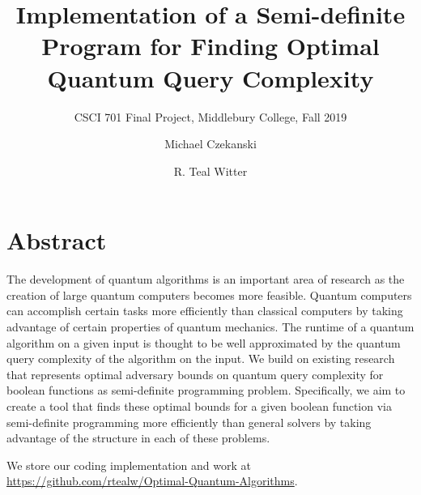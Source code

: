 \documentclass[review]{acmart}
\begin{document}
\title{Implementation of a Semi-definite Program for Finding
Optimal Quantum Query Complexity}

\subtitle{CSCI 701 Final Project, Middlebury College, Fall 2019}

\author{Michael Czekanski}

\author{R. Teal Witter}

\maketitle

\section*{Abstract}

The development of quantum algorithms is an important area
of research as the creation of large quantum computers
becomes more feasible. Quantum computers can accomplish
certain tasks more efficiently than classical computers by
taking advantage of certain properties of quantum mechanics.
The runtime of a quantum algorithm on a given input is
thought to be well approximated by the quantum query
complexity of the algorithm on the input. We build on
existing research that represents optimal adversary bounds
on quantum query complexity for boolean functions as
semi-definite programming problem. Specifically, we aim to
create a tool that finds these optimal bounds for a given
boolean function via semi-definite programming more
efficiently than general solvers by taking advantage of the
structure in each of these problems.

We store our coding implementation and work at
\url{https://github.com/rtealw/Optimal-Quantum-Algorithms}.










\end{document}
